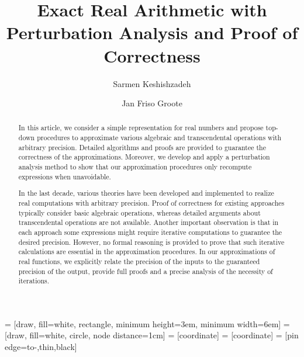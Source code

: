 \documentclass{article}
\numberwithin{mytheorem}{section}
\begin{document}
 = [draw, fill=white, rectangle, 
    minimum height=3em, minimum width=6em]
 = [draw, fill=white, circle, node distance=1cm]
 = [coordinate]
 = [coordinate]
 = [pin edge={to-,thin,black}]





\title{Exact Real Arithmetic with \\
Perturbation Analysis and Proof of Correctness}


\author{Sarmen Keshishzadeh}
\author{Jan Friso Groote}



\maketitle

\begin{abstract}
In this article, we consider a simple representation for real numbers and propose top-down procedures to approximate various algebraic and transcendental operations with arbitrary precision. Detailed algorithms and proofs are provided to guarantee the correctness of the approximations. Moreover, we develop and apply a perturbation analysis method to show that our approximation procedures only recompute expressions when unavoidable. 

In the last decade, various theories have been developed and implemented to realize real computations with arbitrary precision. Proof of correctness for existing approaches typically consider basic algebraic operations, whereas detailed arguments about transcendental operations are not available. Another important observation is that in each approach some expressions might require iterative computations to guarantee the desired precision. However, no formal reasoning is provided to prove that such iterative calculations are essential in the approximation procedures. In our approximations of real functions, we explicitly relate the precision of the inputs to the guaranteed precision of the output, provide full proofs and a precise analysis of the necessity of iterations. 
\end{abstract}
\end{document}
